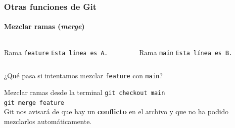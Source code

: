 \documentclass[11pt]{beamer}
\begin{document}
\begin{frame}[fragile]
    \frametitle{Otras funciones de Git}
    \framesubtitle{Mezclar ramas (\textit{merge})}
    
    \begin{columns}[c]
        \begin{column}{0.45\linewidth}
            \begin{block}{Rama \texttt{feature}}
                \texttt{Esta línea es A.}
            \end{block}
        \end{column}

        \begin{column}{0.45\linewidth}
            \begin{block}{Rama \texttt{main}}
                \texttt{Esta línea es B.}
            \end{block}
        \end{column}
    \end{columns}

    \bigskip

    ¿Qué pasa si intentamos mezclar \texttt{feature} con \texttt{main}?
    
    \begin{block}{Mezclar ramas desde la terminal}
        \texttt{git checkout main}\\
        \texttt{git merge feature}\\
        \smallskip
        Git nos avisará de que hay un \textbf{conflicto} en el archivo y que no ha podido mezclarlos automáticamente.
    \end{block}

\end{frame}
\end{document}
